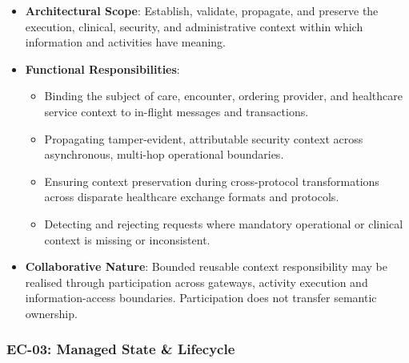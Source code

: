 \begin{itemize}

\item
\textbf{Architectural Scope}: Establish, validate, propagate, and preserve the execution, clinical, security, and administrative context within which information and activities have meaning.



\item
\textbf{Functional Responsibilities}:


\begin{itemize}

\item
Binding the subject of care, encounter, ordering provider, and healthcare service context to in-flight messages and transactions.



\item
Propagating tamper-evident, attributable security context across asynchronous, multi-hop operational boundaries.



\item
Ensuring context preservation during cross-protocol transformations across disparate healthcare exchange formats and protocols.



\item
Detecting and rejecting requests where mandatory operational or clinical context is missing or inconsistent.



\end{itemize}


\item
\textbf{Collaborative Nature}: Bounded reusable context responsibility may be realised through participation across gateways, activity execution and information-access boundaries. Participation does not transfer semantic ownership.



\end{itemize}
\label{rad:enterprise:121}
\subsubsection*{EC-03: Managed State \& Lifecycle}
\label{rad:enterprise:122}

